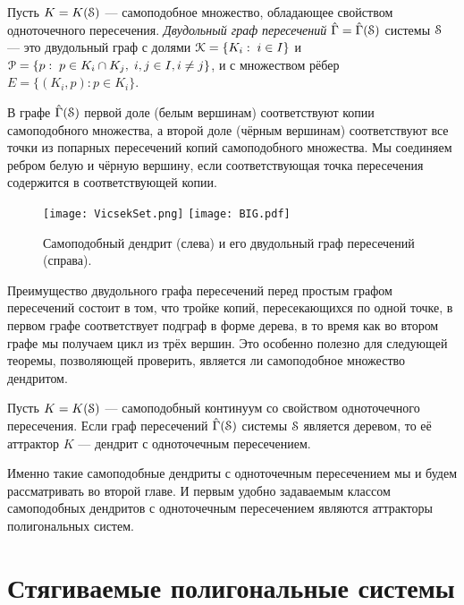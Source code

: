 \begin{definition}\label{dfn:big}
Пусть $K=K({\EuScript S})$ --- самоподобное множество, обладающее свойством одноточечного пересечения.
{\em Двудольный граф пересечений} $\hat\Gamma=\hat\Gamma({\EuScript S})$ системы ${\EuScript S}$ --- это двудольный граф с долями ${\EuScript K}=\{K_i:\; i\in I\}$ и ${\EuScript P}=\{p:\;p\in K_i\cap K_j,\; i,j\in I, i\neq j\}$, и с множеством рёбер $E=\{(K_i,p):p\in K_i\}$.
\end{definition}

В графе $\hat\Gamma({\EuScript S})$ первой доле (белым вершинам) соответствуют копии самоподобного множества, а второй доле (чёрным вершинам) соответствуют все точки из попарных пересечений копий самоподобного множества.
Мы соединяем ребром белую и чёрную вершину, если соответствующая точка пересечения содержится в соответствующей копии.

\begin{figure}[H]
\texttt{[image: VicsekSet.png]}
\hfill
\texttt{[image: BIG.pdf]}
\caption{Самоподобный дендрит (слева) и его двудольный граф пересечений (справа).}
\end{figure}

Преимущество двудольного графа пересечений перед простым графом пересечений состоит в том, что тройке копий, пересекающихся по одной точке, в первом графе соответствует подграф в форме дерева, в то время как во втором графе мы получаем цикл из трёх вершин.
Это особенно полезно для следующей теоремы, позволяющей проверить, является ли самоподобное множество дендритом.

\begin{theorem}
\label{thm:fpden}
Пусть $K=K({\EuScript S})$ --- самоподобный континуум со свойством одноточечного пересечения.
Если граф пересечений $\hat\Gamma({\EuScript S})$ системы ${\EuScript S}$ является деревом, то её аттрактор $K$ --- дендрит с одноточечным пересечением.
\end{theorem}



Именно такие самоподобные дендриты с одноточечным пересечением мы и будем рассматривать во второй главе.  
И первым удобно задаваемым классом самоподобных дендритов с одноточечным пересечением являются аттракторы полигональных систем.

\section{Стягиваемые полигональные системы}

